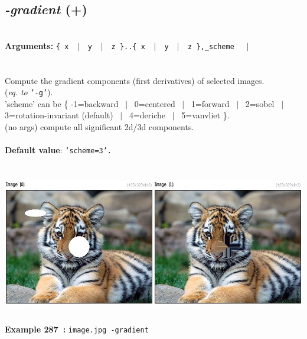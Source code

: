 \documentclass[a4paper,11pt,twoside]{book}
\begin{document}
\subsection{\emph{-gradient} (+)}\vspace*{-0.5em}
~\\\textbf{Arguments: } 
{\small \texttt{\{ x ~$|$~ y ~$|$~ z \}..\{ x ~$|$~ y ~$|$~ z \},\_scheme}}~~~$|$\\
\\~\\
Compute the gradient components (first derivatives) of selected images.
~\\(\emph{eq. to} {\small \texttt{'-g'}}).
~\\'scheme' can be \{ -1=backward ~$|$~ 0=centered ~$|$~ 1=forward ~$|$~ 2=sobel ~$|$~ 3=rotation-invariant (default) ~$|$~ 4=deriche ~$|$~ 5=vanvliet \}.
~\\(no args) compute all significant 2d/3d components.
~\\~\\\textbf{Default value}: {\small \texttt{'scheme=3'.}}
\begin{center}\includegraphics[keepaspectratio=true,height=7cm,width=\textwidth]{img/gmic_def287.jpg}\\
{\footnotesize \textbf{Example 287~:} \texttt{image.jpg -gradient}}
\end{center}
\end{document}
